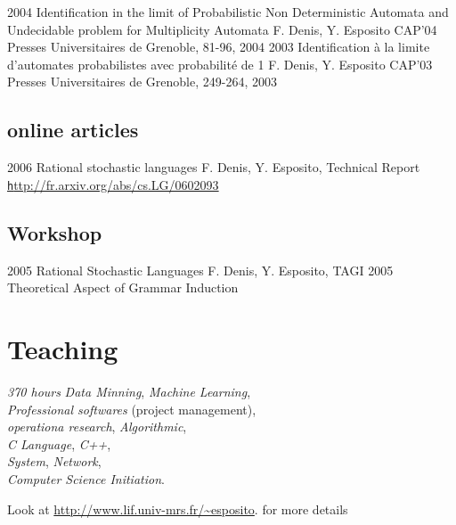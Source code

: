 \article
{2004}
{Identification in the limit of Probabilistic Non Deterministic Automata and Undecidable problem for Multiplicity Automata}
{F. Denis, Y. Esposito}
{CAP'04}
{Presses Universitaires de Grenoble, 81-96, 2004}
\article
{2003}
{Identification à la limite d'automates probabilistes avec probabilité de 1}
{F. Denis, Y. Esposito}
{CAP'03}
{Presses Universitaires de Grenoble, 249-264, 2003}

\subsection*{online articles}

\article
{2006}
{Rational stochastic languages}
{ F. Denis, Y. Esposito,}
{Technical Report}
{\href{http://fr.arxiv.org/abs/cs.LG/0602093}{\texttt http\string://fr.arxiv.org/abs/cs.LG/0602093}}

\subsection*{Workshop}

\article
{2005}
{Rational Stochastic Languages}
{F. Denis, Y. Esposito,}
{TAGI 2005}
{Theoretical Aspect of Grammar Induction}

\section*{Teaching}

{\emph{370 hours}}
{\emph{Data Minning}, \emph{Machine Learning},\\
\emph{Professional softwares} (project management),\\
\emph{operationa research}, \emph{Algorithmic},\\
\emph{C Language}, \emph{C++},\\
\emph{System}, \emph{Network},\\
\emph{Computer Science Initiation}.
}

\footnotesize{
    Look at
    \href{http://www.lif.univ-mrs.fr/~esposito} 
    {http://www.lif.univ-mrs.fr/\textasciitilde{}esposito}.
    for more details
}



